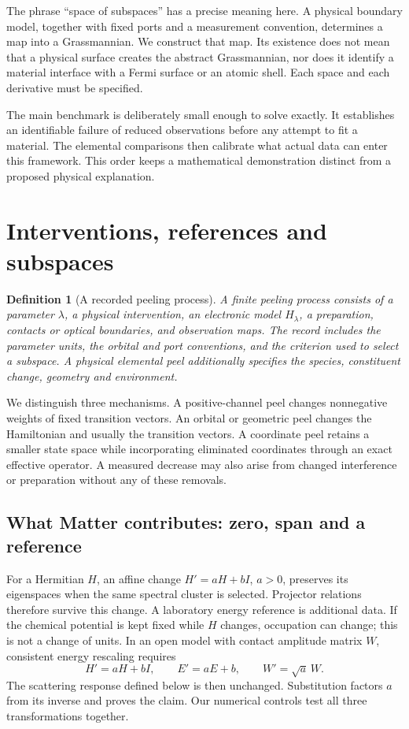 \documentclass[11pt]{article}
\newtheorem{definition}{Definition}
\begin{document}
The phrase ``space of subspaces'' has a precise meaning here. A physical boundary model, together with fixed ports and a measurement convention, determines a map into a Grassmannian. We construct that map. Its existence does not mean that a physical surface creates the abstract Grassmannian, nor does it identify a material interface with a Fermi surface or an atomic shell. Each space and each derivative must be specified.

The main benchmark is deliberately small enough to solve exactly. It establishes an identifiable failure of reduced observations before any attempt to fit a material. The elemental comparisons then calibrate what actual data can enter this framework. This order keeps a mathematical demonstration distinct from a proposed physical explanation.

\section{Interventions, references and subspaces}
\begin{definition}[A recorded peeling process]
A finite peeling process consists of a parameter $\lambda$, a physical intervention, an electronic model $H_\lambda$, a preparation, contacts or optical boundaries, and observation maps. The record includes the parameter units, the orbital and port conventions, and the criterion used to select a subspace. A physical elemental peel additionally specifies the species, constituent change, geometry and environment.
\end{definition}

We distinguish three mechanisms. A positive-channel peel changes nonnegative weights of fixed transition vectors. An orbital or geometric peel changes the Hamiltonian and usually the transition vectors. A coordinate peel retains a smaller state space while incorporating eliminated coordinates through an exact effective operator. A measured decrease may also arise from changed interference or preparation without any of these removals.

\subsection{What Matter contributes: zero, span and a reference}
For a Hermitian $H$, an affine change $H'=aH+bI$, $a>0$, preserves its eigenspaces when the same spectral cluster is selected. Projector relations therefore survive this change. A laboratory energy reference is additional data. If the chemical potential is kept fixed while $H$ changes, occupation can change; this is not a change of units. In an open model with contact amplitude matrix $W$, consistent energy rescaling requires
\begin{equation}
 H'=aH+bI,\qquad E'=aE+b,\qquad W'=\sqrt a\,W.
 \label{eq:affine}
\end{equation}
The scattering response defined below is then unchanged. Substitution factors $a$ from its inverse and proves the claim. Our numerical controls test all three transformations together.
\end{document}
